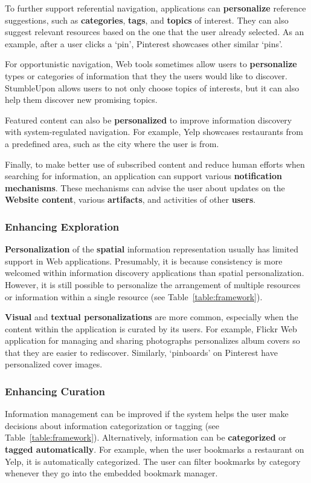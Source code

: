 \documentclass{sigchi}
\begin{document}
{{{To further support referential navigation, applications can \textbf{personalize} reference suggestions, such as \textbf{categories}, \textbf{tags}, and \textbf{topics} of interest. They can also suggest relevant resources based on the one that the user already selected. As an example, after a user clicks a `pin', Pinterest showcases other similar `pins'.

For opportunistic navigation, Web tools sometimes allow users to \textbf{personalize} types or categories of information that they the users would like to discover. StumbleUpon allows users to not only choose topics of interests, but it can also help them discover new promising topics.


Featured content can also be \textbf{personalized} to improve information discovery with system-regulated navigation. For example, Yelp showcases restaurants from a predefined area, such as the city where the user is from.

Finally, to make better use of subscribed content and reduce human efforts when searching for information, an application can support various \textbf{notification mechanisms}. These mechanisms can advise the user about updates on the \textbf{Website content}, various \textbf{artifacts}, and activities of other \textbf{users}.  

} %
{\subsubsection{Enhancing Exploration}
\textbf{Personalization} of the \textbf{spatial} information representation usually has limited support in Web applications. Presumably, it is because consistency is more welcomed within information discovery applications than spatial personalization. However, it is still possible to personalize the arrangement of multiple resources or information within a single resource (see Table~\ref{table:framework}). 

\textbf{Visual} and \textbf{textual personalizations} are more common, especially when the content within the application is curated by its users.  For example, Flickr Web application for managing and sharing photographs personalizes album covers so that they are easier to rediscover. Similarly, `pinboards' on Pinterest have personalized cover images.



{\subsubsection{Enhancing Curation}
Information management can be improved if the system helps the user make decisions about information categorization or tagging (see Table~\ref{table:framework}). Alternatively, information can be \textbf{categorized} or \textbf{tagged automatically}. For example, when the user bookmarks a restaurant on Yelp, it is automatically categorized. The user can filter bookmarks by category whenever they go into the embedded bookmark manager. 

}}}}
\end{document}
